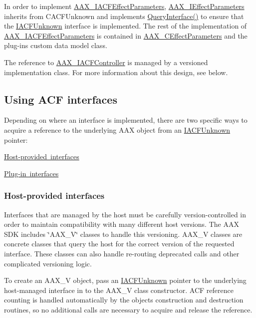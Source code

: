 In order to implement \mbox{\hyperlink{a01669}{A\+A\+X\+\_\+\+I\+A\+C\+F\+Effect\+Parameters}}, \mbox{\hyperlink{a01825}{A\+A\+X\+\_\+\+I\+Effect\+Parameters}} inherits from {\ttfamily C\+A\+C\+F\+Unknown} and implements \mbox{\hyperlink{a01409_a8b7f0ae9c78d007ca76aa462ebe53135}{Query\+Interface()}} to ensure that the \mbox{\hyperlink{a01409}{I\+A\+C\+F\+Unknown}} interface is implemented. The rest of the implementation of \mbox{\hyperlink{a01669}{A\+A\+X\+\_\+\+I\+A\+C\+F\+Effect\+Parameters}} is contained in \mbox{\hyperlink{a01481}{A\+A\+X\+\_\+\+C\+Effect\+Parameters}} and the plug-\/in\textquotesingle{}s custom data model class.

The reference to \mbox{\hyperlink{a01637}{A\+A\+X\+\_\+\+I\+A\+C\+F\+Controller}} is managed by a versioned implementation class. For more information about this design, see below.\hypertarget{a00827_using_acf}{}\subsection{Using A\+C\+F interfaces}\label{a00827_using_acf}
Depending on where an interface is implemented, there are two specific ways to acquire a reference to the underlying A\+AX object from an \mbox{\hyperlink{a01409}{I\+A\+C\+F\+Unknown}} pointer\+:

\begin{DoxyItemize}
\item \mbox{\hyperlink{a00827_using_acf_host_provided_interfaces}{Host-\/provided interfaces}} \item \mbox{\hyperlink{a00827_using_acf_plug_in_interfaces}{Plug-\/in interfaces}}\end{DoxyItemize}
\hypertarget{a00827_using_acf_host_provided_interfaces}{}\subsubsection{Host-\/provided interfaces}\label{a00827_using_acf_host_provided_interfaces}
Interfaces that are managed by the host must be carefully version-\/controlled in order to maintain compatibility with many different host versions. The A\+AX S\+DK includes \char`\"{}\+A\+A\+X\+\_\+\+V\char`\"{} classes to handle this versioning. A\+A\+X\+\_\+V classes are concrete classes that query the host for the correct version of the requested interface. These classes can also handle re-\/routing deprecated calls and other complicated versioning logic.

To create an A\+A\+X\+\_\+V object, pass an \mbox{\hyperlink{a01409}{I\+A\+C\+F\+Unknown}} pointer to the underlying host-\/managed interface in to the A\+A\+X\+\_\+V class\textquotesingle{} constructor. A\+CF reference counting is handled automatically by the object\textquotesingle{}s construction and destruction routines, so no additional calls are necessary to acquire and release the reference.


